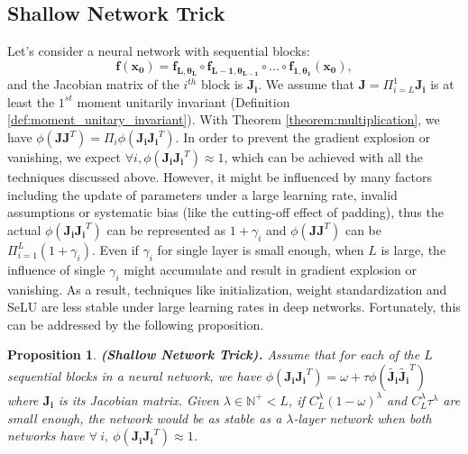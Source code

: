 \documentclass[10pt,journal,compsoc]{IEEEtran}
\newtheorem{prop}{Proposition}[section]
\begin{document}
\subsection{Shallow Network Trick}
Let's consider a neural network with sequential blocks: 
\begin{equation}
    \mathbf{f}(\mathbf{x_0}) = \mathbf{f_{L,\theta_L}}\circ \mathbf{f_{L-1,\theta_{L-1}}}\circ...\circ\mathbf{f_{1, \theta_1}}\left(\mathbf{x_0}\right),
\end{equation}
and the Jacobian matrix of the $i^{th}$ block is $\mathbf{J_i}$. We assume that $\mathbf{J} = \Pi_{i=L}^1\mathbf{J_i}$ is at least the $1^{st}$ moment unitarily invariant (Definition \ref{def:moment_unitary_invariant}). With Theorem \ref{theorem:multiplication}, we have $\phi(\mathbf{JJ}^T) = \Pi_i\phi(\mathbf{J_iJ_i}^T)$. In order to prevent the gradient explosion or vanishing, we expect $\forall i, \phi(\mathbf{J_iJ_i}^T) \approx 1$, which can be achieved with all the techniques discussed above. However, it might be influenced by many factors including the update of parameters under a large learning rate, invalid assumptions or systematic bias (like the cutting-off effect of padding), thus the actual $\phi(\mathbf{J_iJ_i}^T)$ can be represented as $1 + \gamma_i$ and $\phi(\mathbf{JJ}^T)$ can be $\Pi_{i=1}^L(1 + \gamma_i)$. Even if $\gamma_i$ for single layer is small enough, when $L$ is large, the influence of single $\gamma_i$ might accumulate and result in gradient explosion or vanishing. As a result, techniques like initialization, weight standardization and SeLU are less stable under large learning rates in deep networks. Fortunately, this can be addressed by the following proposition.
\begin{prop}
\textbf{(Shallow Network Trick).} Assume that for each of the $L$ sequential blocks in a neural network, we have $\phi(\mathbf{J_iJ_i}^T)=\omega+\tau\phi(\widetilde{\mathbf{J_i}}\widetilde{\mathbf{J_i}}^T)$ where $\mathbf{J_i}$ is its Jacobian matrix. Given $\lambda\in \mathbb{N}^+<L$, if $C_L^{\lambda}(1-\omega)^{\lambda}$ and $C_L^{\lambda}\tau^{\lambda}$ are small enough, the network would be as stable as a $\lambda$-layer network when both networks have $\forall~i,~\phi(\mathbf{J_iJ_i}^T)\approx1$.
\label{prop:shallow_network_trick}
\end{prop}
\end{document}
